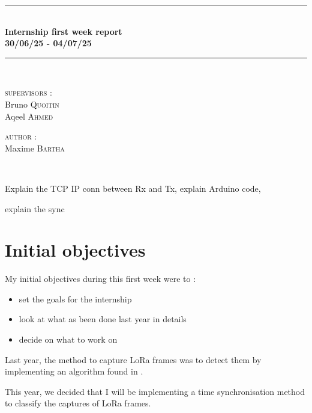 \documentclass[a4paper, 12pt]{article}
\newcommand{\HRule}{\rule{\linewidth}{0.3mm}}
\begin{document}
\begin{center}
\HRule \\[0.3cm]
{ \LARGE \bfseries Internship first week report \\[0.3cm]}
{ \LARGE \bfseries 30/06/25 - 04/07/25 \\[0.1cm]}
\HRule \\[1.5cm]

\begin{minipage}[t]{0.45\textwidth}
\begin{flushleft} \large
\textsc{supervisors :}\\
Bruno \textsc{Quoitin}\\
Aqeel \textsc{Ahmed}\\
\end{flushleft}

\end{minipage}
\begin{minipage}[t]{0.45\textwidth}
\begin{flushright} \large
\textsc{author :}\\
Maxime \textsc{Bartha}\\
\end{flushright}
\end{minipage}\\[2ex]
\end{center}

Explain the TCP IP conn between Rx and Tx, explain Arduino code, 

explain the sync



\section{Initial objectives}
My initial objectives during this first week were to :
\begin{itemize}
  \item set the goals for the internship
  \item look at what as been done last year in details
  \item decide on what to work on
\end{itemize}


Last year, the method to capture LoRa frames was to detect them by implementing an algorithm found in \cite{demToDec}.

This year, we decided that I will be implementing a time synchronisation method to classify the captures of LoRa frames.
\end{document}
